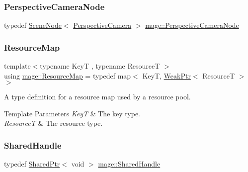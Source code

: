 \hypertarget{namespacemage_a4542f24699be53c2f30040ce575155a7}{}\label{namespacemage_a4542f24699be53c2f30040ce575155a7} 
\subsubsection{\texorpdfstring{Perspective\+Camera\+Node}{PerspectiveCameraNode}}
{\footnotesize\ttfamily typedef \hyperlink{classmage_1_1_scene_node}{Scene\+Node}$<$ \hyperlink{classmage_1_1_perspective_camera}{Perspective\+Camera} $>$ \hyperlink{namespacemage_a4542f24699be53c2f30040ce575155a7}{mage\+::\+Perspective\+Camera\+Node}}

\hypertarget{namespacemage_a0b0a087ad59dd4aa0b4b538d8caec216}{}\label{namespacemage_a0b0a087ad59dd4aa0b4b538d8caec216} 
\subsubsection{\texorpdfstring{Resource\+Map}{ResourceMap}}
{\footnotesize\ttfamily template$<$typename KeyT , typename ResourceT $>$ \\
using \hyperlink{namespacemage_a0b0a087ad59dd4aa0b4b538d8caec216}{mage\+::\+Resource\+Map} = typedef map$<$ KeyT, \hyperlink{namespacemage_aa159a63c0d58464bdf32dfe419dd5dc1}{Weak\+Ptr}$<$ ResourceT $>$ $>$}

A type definition for a resource map used by a resource pool.


\begin{DoxyTemplParams}{Template Parameters}
{\em KeyT} & The key type. \\
\hline
{\em ResourceT} & The resource type. \\
\hline
\end{DoxyTemplParams}
\hypertarget{namespacemage_ab892828913d6129acf71e0cec60467e5}{}\label{namespacemage_ab892828913d6129acf71e0cec60467e5} 
\subsubsection{\texorpdfstring{Shared\+Handle}{SharedHandle}}
{\footnotesize\ttfamily typedef \hyperlink{namespacemage_a1e01ae66713838a7a67d30e44c67703e}{Shared\+Ptr}$<$ void $>$ \hyperlink{namespacemage_ab892828913d6129acf71e0cec60467e5}{mage\+::\+Shared\+Handle}}

